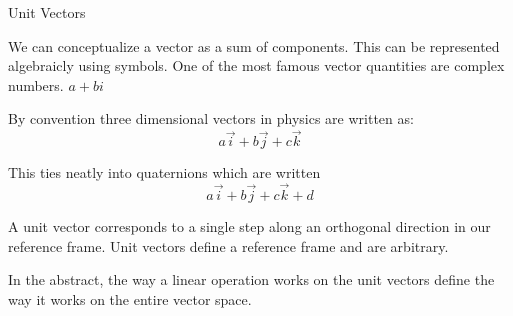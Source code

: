 \documentclass{report}
\begin{document}
\begin{description}
    \item Unit Vectors
        \begin{mdframed}
            We can conceptualize a vector as a sum of 
            components. This can be represented algebraicly
            using symbols. One of the most famous vector
            quantities are complex numbers. $a + bi$

            By convention three dimensional vectors in physics
            are written as:
            \begin{displaymath}
                a\vec{i} + b\vec{j} + c\vec{k}
            \end{displaymath}

            This ties neatly into quaternions which are written
            \begin{displaymath}
                a\vec{i} + b\vec{j} + c\vec{k} + d
            \end{displaymath}

            A unit vector corresponds to a single step along
            an orthogonal direction in our reference frame.
            Unit vectors define a reference frame and are
            arbitrary.
            \begin{center}
            \end{center}
            
            In the abstract, the way a linear operation works on the
            unit vectors define the way it works on the entire
            vector space.

            \begin{center}
            \end{center}
        \end{mdframed}
\end{description}
\end{document}
